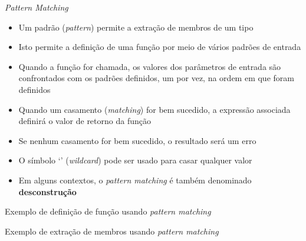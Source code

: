 \begin{frame}[fragile]{\it Pattern Matching}

    \begin{itemize}
        \item Um padrão (\textit{pattern}) permite a extração de membros de um tipo

        \item Isto permite a definição de uma função por meio de vários padrões de entrada

        \item Quando a função for chamada, os valores dos parâmetros de entrada são 
            confrontados com os padrões definidos, um por vez, na ordem em que foram definidos

        \item Quando um casamento (\textit{matching}) for bem sucedido, a expressão associada
            definirá o valor de retorno da função

        \item Se nenhum casamento for bem sucedido, o resultado será um erro

        \item O símbolo `' (\textit{wildcard}) pode ser usado para casar qualquer
            valor

        \item Em alguns contextos, o \textit{pattern matching} é também denominado 
            \textbf{desconstrução}
    \end{itemize}

\end{frame}

\begin{frame}[fragile]{Exemplo de definição de função usando {\it pattern matching}}
\end{frame}

\begin{frame}[fragile]{Exemplo de extração de membros usando {\it pattern matching}}
\end{frame}

